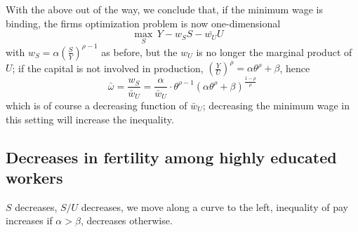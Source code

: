 \documentclass{homework}
\begin{document}
With the above out of the way, we conclude that, if the minimum wage is binding, the firms optimization problem is now one-dimensional \[\max_S\, Y-w_S S - \bar{w_U}U \quad {} \]
with  $w_S = \alpha\left(\frac{S}{Y}\right)^{\rho-1}$ as before, but the $w_U$ is no longer the marginal product of $U$; if the capital is not involved in production, $\left(\frac{Y}{U}\right)^\rho = \alpha \theta^\rho + \beta$,
hence \[\bar{\omega} = \frac{w_S}{\bar{w}_U} = \frac{\alpha}{\bar{w}_U} \cdot \theta^{\rho-1} \left(\alpha\theta^\rho + \beta\right)^{\frac{1-\rho}{\rho}} \] 
which is of course a decreasing function of $\bar{w}_U$; decreasing the minimum wage in this setting will increase the inequality.


\subsection{Decreases in fertility among highly educated workers}
$S$ decreases, $S/U$ decreases, we move along a curve to the left, inequality of pay increases if $\alpha>\beta$, decreases otherwise.

%
%
\end{document}
